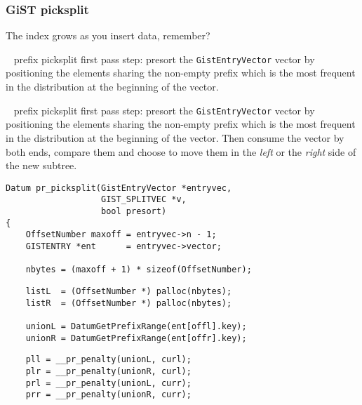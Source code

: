 \documentclass{beamer}
\begin{document}
\begin{frame}[fragile]
  \frametitle{GiST picksplit}

  The index grows as you insert data, remember?

  \begin{overprint}

  ~
  \linebreak
  prefix picksplit first pass step: presort the \texttt{GistEntryVector}
  vector by positioning the elements sharing the non-empty prefix which is
  the most frequent in the distribution at the beginning of the vector.
  \linebreak
  \linebreak

  ~
  \linebreak
  prefix picksplit first pass step: presort the \texttt{GistEntryVector}
  vector by positioning the elements sharing the non-empty prefix which is
  the most frequent in the distribution at the beginning of the vector.
  \linebreak
  \linebreak
  Then consume the vector by both ends, compare them and choose to move them
  in the \textit{left} or the \textit{right} side of the new subtree.

  \begin{example}
  \begin{verbatim}
Datum pr_picksplit(GistEntryVector *entryvec,
                   GIST_SPLITVEC *v,
                   bool presort)
{
    OffsetNumber maxoff = entryvec->n - 1;
    GISTENTRY *ent      = entryvec->vector;

    nbytes = (maxoff + 1) * sizeof(OffsetNumber);
  \end{verbatim}
  \end{example}

  \begin{example}
  \begin{verbatim}
    listL  = (OffsetNumber *) palloc(nbytes);
    listR  = (OffsetNumber *) palloc(nbytes);

    unionL = DatumGetPrefixRange(ent[offl].key);
    unionR = DatumGetPrefixRange(ent[offr].key);
  \end{verbatim}
  \end{example}

  \begin{example}
  \begin{verbatim}
    pll = __pr_penalty(unionL, curl);
    plr = __pr_penalty(unionR, curl);
    prl = __pr_penalty(unionL, curr);
    prr = __pr_penalty(unionR, curr);
  \end{verbatim}
  \end{example}


\end{overprint}
\end{frame}
\end{document}
